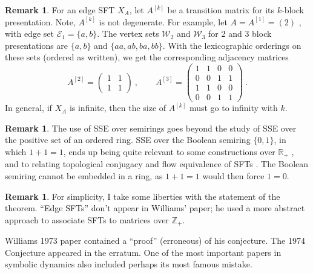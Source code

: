 \documentclass{amsart}
\newcommand{\si}{\index}
\newcommand{\ai}{\index[authors]}
\theoremstyle{definition}
\newtheorem{rem}[equation]{Remark}
\theoremstyle{definition}
\newcommand{\Z}{\mathbb Z}
\newcommand{\R}{\mathbb R}
\numberwithin{equation}{subsection}
\begin{document}
\begin{rem} \label{higherblockedgesfts}
  For an edge SFT $X_A$, let $A^{[k]}$ be a transition
  matrix for its $k$-block presentation. Note, $A^{[k]}$ is not degenerate.
For example, let
$     A=A^{[1]}= (2)$ ,
with edge set $\mathcal E_1=\{a,b\}$.
The vertex sets $\mathcal W_2$ and $ \mathcal W_3$ for
2 and 3 block presentations are
$\{ a,b\}$ and
$\{aa,ab,ba,bb\}$. With the lexicographic orderings on these
sets (ordered as written),
we get the corresponding
adjacency matrices
\[
     A^{[2]} = \begin{pmatrix} 1&1\\1&1\end{pmatrix} \ , \qquad
 A^{[3]} = \begin{pmatrix} 1&1&0&0 \\0&0&1&1
\\ 1&1&0&0
         \\0&0&1&1
       \end{pmatrix}\  .
 \]
 In general, if  $X_A$ is infinite, then the size of $A^{[k]}$ must go
 to infinity with $k$.
\end{rem}







\begin{rem} \label{boolean}
The use of SSE over semirings goes beyond the study of
SSE over the positive set of an ordered ring.
 SSE over the Boolean semiring $\{ 0,1 \}$, in which $1+1=1$,
ends up being  quite relevant to some constructions over
$\R_+$ \cite{BKR2013}, and
 to relating topological conjugacy and flow equivalence\si{flow equivalence} of
SFTs \cite{B02posk}. The Boolean semiring cannot be embedded in a ring,
as  $1+1=1$ would then force $1=0$.
\end{rem}




\begin{rem} \label{liberties}
  For simplicity, I  take some liberties with the statement of
  the theorem. ``Edge SFTs'' don't appear in Williams' paper;
  he used a more abstract approach to
 associate SFTs to   matrices over $\Z_+$.

  Williams\ai{Williams, R.F.} 1973 paper \cite{Williams73}
   contained a ``proof'' (erroneous) of
  his conjecture. The 1974 Conjecture appeared in the erratum.
  One of the most important papers in symbolic dynamics also included
  perhaps its most famous mistake.
\end{rem}
\end{document}

